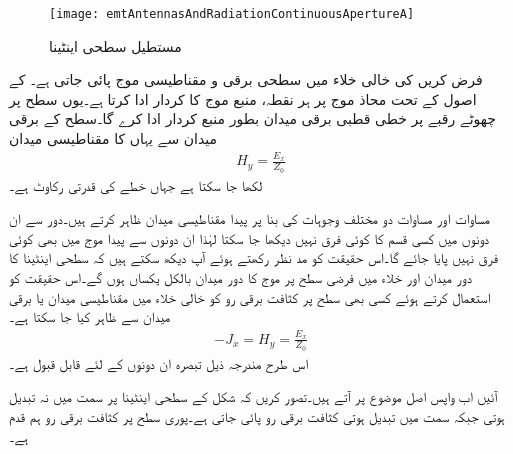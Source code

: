 \begin{figure}
\centering
\texttt{[image: emtAntennasAndRadiationContinuousApertureA]}
\caption{مستطیل سطحی اینٹینا}
\label{شکل_اینٹینا_مستطیل_سطحی}
\end{figure}

فرض کریں کی خالی خلاء میں سطحی برقی و مقناطیسی موج پائی جاتی ہے۔ کے اصول کے تحت محاذ موج پر ہر نقطہ، منبع موج کا کردار ادا کرتا ہے۔یوں سطح پر چھوٹے رقبے   پر خطی قطبی برقی میدان  بطور منبع کردار ادا کرے گا۔سطح کے برقی میدان  سے یہاں کا مقناطیسی میدان
\begin{align}\label{مساوات_اینٹینا_فرضی_مقناطیسی_میدان}
H_y=\frac{E_x}{Z_0}
\end{align}
لکھا جا سکتا ہے جہاں  خطے کی قدرتی رکاوٹ  ہے۔

مساوات  اور مساوات  دو مختلف وجوہات کی بنا پر پیدا مقناطیسی میدان ظاہر کرتے ہیں۔دور سے ان دونوں میں کسی قسم کا کوئی فرق نہیں دیکھا جا سکتا لہٰذا ان دونوں سے پیدا موج میں بھی کوئی فرق نہیں پایا جائے گا۔اس حقیقت کو مد نظر رکھتے ہوئے  آپ دیکھ سکتے ہیں کہ سطحی اینٹینا کا دور میدان اور  خلاء میں فرضی سطح پر موج کا دور میدان بالکل یکساں ہوں گے۔اس حقیقت کو استعمال کرتے ہوئے کسی بھی سطح پر کثافت برقی رو  کو خالی خلاء میں مقناطیسی میدان  یا برقی میدان  سے ظاہر کیا جا سکتا ہے۔
\begin{align}\label{مساوات_اینٹینا_حقیقی_اور_فرضی}
-J_x=H_y=\frac{E_x}{Z_0}
\end{align}
اس طرح مندرجہ ذیل تبصرہ ان دونوں کے لئے قابل قبول ہے۔

آئیں اب واپس اصل موضوع پر آتے ہیں۔تصور کریں کہ شکل  کے سطحی اینٹینا پر  سمت میں نہ تبدیل ہوتی جبکہ  سمت میں تبدیل ہوتی کثافت برقی رو  پائی جاتی ہے۔پوری سطح پر کثافت برقی رو ہم قدم ہے۔

